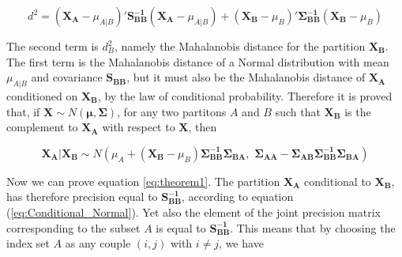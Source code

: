 \documentclass{book}
\begin{document}
$$ d^2 = 
\left( \mathbf{X_A} - \mu_{A|B} \right)' \mathbf{S_{BB}^{-1}}\left( \mathbf{X_A} - \mu_{A|B}\right) + 
\left( \mathbf{X_B} - \mu_B \right)'\mathbf{\Sigma_{BB}^{-1}}\left( \mathbf{X_B} - \mu_B\right)
$$
 
The second term is $d_B^2$, namely the Mahalanobis distance for the partition $\mathbf{X_B}$. The first term is the Mahalanobis distance of a Normal distribution with mean $\mu_{A|B}$ and covariance $\mathbf{S_{BB}}$, but it must also be the Mahalanobis distance of $\mathbf{X_A}$ conditioned on $\mathbf{X_B}$, by the law of conditional probability. 
Therefore it is proved that, if $\mathbf{X} \sim N(\mathbf{\mu}, \mathbf{\Sigma})$, for any two partitons $A$ and $B$ such that $\mathbf{X_B}$ is the complement to $\mathbf{X_A}$ with respect to $\mathbf{X}$, then 

\begin{equation}
	\mathbf{X_A} | \mathbf{X_B} \sim N \left(
	\mu_A + (\mathbf{X_B} - \mu_B) \mathbf{\Sigma_{BB}^{-1}} \mathbf{\Sigma_{BA}}, \, \,
	 \mathbf{\Sigma_{AA}} - \mathbf{\Sigma_{AB}} \mathbf{\Sigma^{-1}_{BB}} \mathbf{\Sigma_{BA}}
	 \right)
	 \label{eq:Conditional_Normal}
\end{equation}

Now we can prove equation \ref{eq:theorem1}.
The partition $\mathbf{X_A}$ conditional to $\mathbf{X_B}$, has therefore precision equal to $\mathbf{S_{BB}^{-1}}$, according to equation (\ref{eq:Conditional_Normal}). Yet also the element of the joint precision matrix corresponding to the subset $A$ is equal to $\mathbf{S_{BB}^{-1}}$.
This means that by choosing the index set $A$ as any couple $(i,j)$ with $i \neq j$, we have
\end{document}
